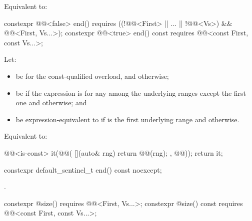 \begin{itemdescr}
\pnum
\effects
Equivalent to:
\end{itemdescr}

\begin{itemdecl}
constexpr @@<false> end()
  requires ((!@@<First> || ... || !@@<Vs>)
    && @@<First, Vs...>);
constexpr @@<true> end() const
  requires @@<const First, const Vs...>;
\end{itemdecl}

\begin{itemdescr}
\pnum
Let:
\begin{itemize}
\item
{} be  for the const-qualified overload, and
 otherwise;
\item
{} be 
if the expression  is 
for any  among the underlying ranges except the first one and
 otherwise; and
\item
{} be expression-equivalent to
if  is the first underlying range and
 otherwise.
\end{itemize}

\pnum
\effects
Equivalent to:
\begin{codeblock}
@@<is-const> it(@@(
  [](auto& rng){ return @@(rng); }, @@));
return it;
\end{codeblock}
\end{itemdescr}

\begin{itemdecl}
constexpr default_sentinel_t end() const noexcept;
\end{itemdecl}

\begin{itemdescr}
\pnum
\returns
{}.
\end{itemdescr}

\begin{itemdecl}
constexpr @\seebelow@ size()
  requires @@<First, Vs...>;
constexpr @\seebelow@ size() const
  requires @@<const First, const Vs...>;
\end{itemdecl}

